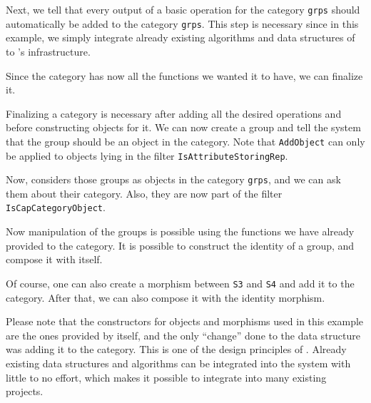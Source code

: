 

Next, we tell \CapPkg that every output of a basic operation for the category \texttt{grps} should automatically be added to the category \texttt{grps}.
This step is necessary since in this example, we simply integrate already existing algorithms and data structures of \GAP to
\CapPkg's infrastructure.



Since the category has now all the functions we wanted it to have, we can finalize it.



Finalizing a category is necessary after adding all the desired operations and before constructing objects
for it. We can now create a group and tell the system that the group should be an object in the category.
Note that \texttt{AddObject} can only be applied to \GAP objects lying in the filter
\texttt{IsAttributeStoringRep}.



Now, \CapPkg considers those groups as objects in the category \texttt{grps}, and we can
ask them about their category. Also, they are now part of the \GAP filter \texttt{IsCapCategoryObject}.



Now manipulation of the groups is possible using the functions we have already provided to the category.
It is possible to construct the identity of a group, and compose it with itself.



Of course, one can also create a morphism between \texttt{S3} and \texttt{S4} and add it to the category.
After that, we can also compose it with the identity morphism.



Please note that the constructors for objects and morphisms used in this example are the ones provided
by \GAP itself, and the only ``change'' done to the data structure was adding it to the category.
This is one of the design principles of \CapPkg. Already existing data structures and algorithms
can be integrated into the system with little to no effort, which makes it possible to integrate \CapPkg
into many existing projects.

